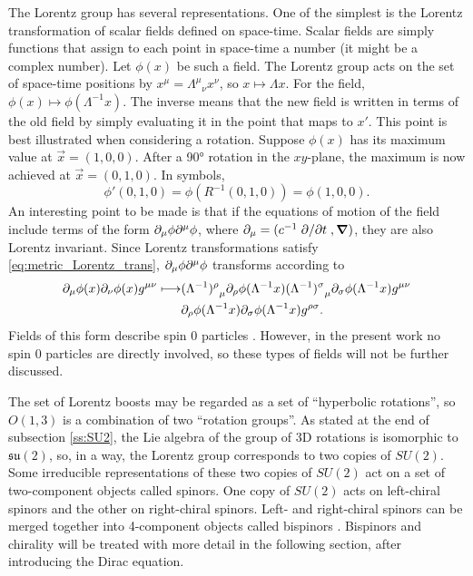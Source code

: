 The Lorentz group has several representations. One of the simplest is the Lorentz transformation of scalar fields defined on space-time. Scalar fields are simply functions that assign to each point in space-time a number (it might be a complex number). Let $\phi(x)$ be such a field. The Lorentz group acts on the set of space-time positions by $x^{\mu} = {\Lambda^{\mu}}_{\nu} x^{\nu}$, so $x\mapsto \Lambda x$. For the field, $\phi(x) \mapsto \phi(\Lambda^{-1} x)$. The inverse means that the new field is written in terms of the old field by simply evaluating it in the point that maps to $x'$. This point is best illustrated when considering a rotation. Suppose $\phi(x)$ has its maximum value at $\Vec{x} = (1,0,0)$. After a \ang{90} rotation in the $xy$-plane, the maximum is now achieved at $\Vec{x}=(0,1,0)$. In symbols, $$\phi'(0,1,0)= \phi(R^{-1}(0,1,0)) = \phi(1,0,0).$$ An interesting point to be made is that if the equations of motion of the field include terms of the form $\dcov \phi \dcon \phi$, where $\dcov = (c^{-1}\pdv*{t},\grad)$, they are also Lorentz invariant. Since Lorentz transformations satisfy \eqref{eq:metric_Lorentz_trans}, $\dcov \phi \dcon \phi$ transforms according to
\begin{align*}
    \dcov \phi(x) \dcov[\nu] \phi(x) g^{\mu\nu} \longmapsto & {(\Lambda^{-1})^{\rho}}_{\mu} \dcov[\rho] \phi(\Lambda^{-1}x) {(\Lambda^{-1})^{\sigma}}_{\mu} \dcov[\sigma] \phi(\Lambda^{-1}x) g^{\mu\nu}\\
    & \dcov[\rho] \phi(\Lambda^{-1}x) \dcov[\sigma] \phi(\Lambda^{-1}x) g^{\rho\sigma}.
\end{align*}
Fields of this form describe spin 0 particles \cite{peskin_introduction_1995}. However, in the present work no spin 0 particles are directly involved, so these types of fields will not be further discussed.

The set of Lorentz boosts may be regarded as a set of ``hyperbolic rotations'', so $O(1,3)$ is a combination of two ``rotation groups''. As stated at the end of subsection \ref{ss:SU2}, the Lie algebra of the group of 3D rotations is isomorphic to $\mathfrak{su}(2)$, so, in a way, the Lorentz group corresponds to two copies of $SU(2)$. Some irreducible representations of these two copies of $SU(2)$ act on a set of two-component objects called spinors. One copy of $SU(2)$ acts on left-chiral spinors and the other on right-chiral spinors. Left- and right-chiral spinors can be merged together into 4-component objects called bispinors \cite{schwichtenberg_physics_2017}. Bispinors and chirality will be treated with more detail in the following section, after introducing the Dirac equation.

